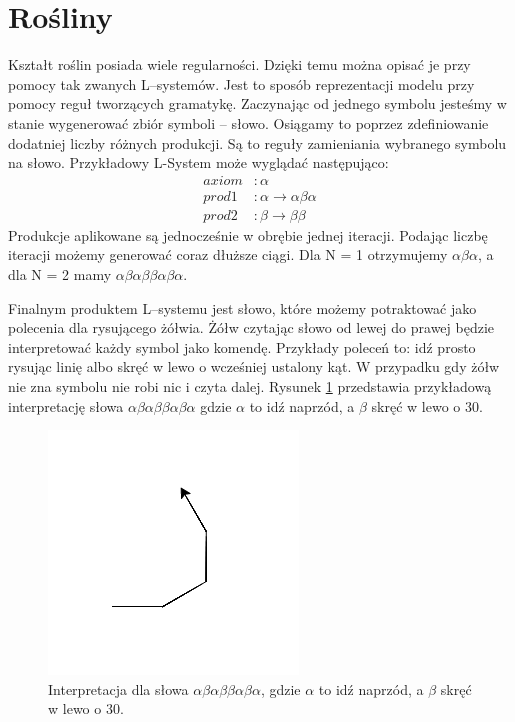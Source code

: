 \documentclass[inz,longabstract]{iithesis}
\begin{document}
    \section{Rośliny}
        Kształt roślin posiada wiele regularności. Dzięki temu można opisać je przy pomocy tak zwanych L--systemów. Jest to sposób reprezentacji modelu przy pomocy reguł tworzących gramatykę. Zaczynając od jednego symbolu jesteśmy w stanie wygenerować zbiór symboli -- słowo. Osiągamy to poprzez zdefiniowanie dodatniej liczby różnych produkcji. Są to reguły zamieniania wybranego symbolu na słowo. Przykładowy L-System może wyglądać następująco:
        \begin{align*}
            axiom &: \alpha \\
            prod1 &: \alpha \rightarrow \alpha\beta\alpha \\
            prod2 &: \beta \rightarrow \beta\beta
        \end{align*}
        Produkcje aplikowane są jednocześnie w obrębie jednej iteracji. Podając liczbę iteracji możemy generować coraz dłuższe ciągi. Dla N = 1 otrzymujemy $\alpha\beta\alpha$, a dla N = 2 mamy $\alpha\beta\alpha\beta\beta\alpha\beta\alpha$.
        
        Finalnym produktem L--systemu jest słowo, które możemy potraktować jako polecenia dla rysującego żółwia. Żółw czytając słowo od lewej do prawej będzie interpretować każdy symbol jako komendę. Przykłady poleceń to: idź prosto rysując linię albo skręć w lewo o wcześniej ustalony kąt. W przypadku gdy żółw nie zna symbolu nie robi nic i czyta dalej. Rysunek \ref{fig:turtleExample} przedstawia przykładową interpretację słowa $\alpha\beta\alpha\beta\beta\alpha\beta\alpha$ gdzie $\alpha$ to idź naprzód, a $\beta$ skręć w lewo o 30\degree.
        \begin{figure}[H]
            \centering
            \includegraphics[width=0.4\linewidth]{turtleExample.png}
            \caption{Interpretacja dla słowa $\alpha\beta\alpha\beta\beta\alpha\beta\alpha$, gdzie $\alpha$ to idź naprzód, a $\beta$ skręć w lewo o 30\degree.}
            \label{fig:turtleExample}
        \end{figure}
        
\end{document}
